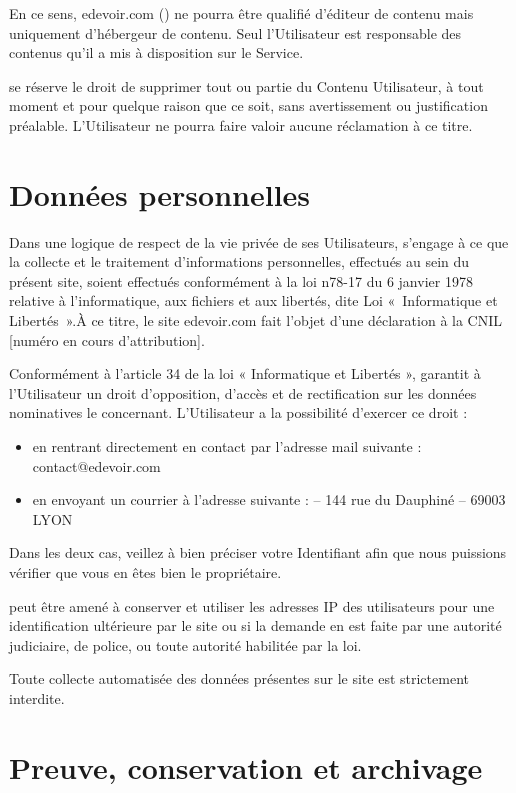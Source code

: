 En ce sens, edevoir.com (\eDevoir) ne pourra être qualifié d'éditeur de contenu mais uniquement d'hébergeur de contenu. Seul l'Utilisateur est responsable des contenus qu'il a mis à disposition sur le Service.

\eDevoir se réserve le droit de supprimer tout ou partie du Contenu Utilisateur, à tout moment et pour quelque raison que ce soit, sans avertissement ou justification préalable. L'Utilisateur ne pourra faire valoir aucune réclamation à ce titre. 


\section{Données personnelles}

Dans une logique de respect de la vie privée de ses Utilisateurs, \eDevoir s'engage à ce que la collecte et le traitement d'informations personnelles, effectués au sein du présent site, soient effectués conformément à la loi n78-17 du 6 janvier 1978 relative à l'informatique, aux fichiers et aux libertés, dite Loi «~Informatique et Libertés~».À ce titre, le site edevoir.com fait l'objet d'une déclaration à la CNIL [numéro en cours d'attribution].

Conformément à l'article 34 de la loi « Informatique et Libertés », \eDevoir garantit à l'Utilisateur un droit d'opposition, d'accès et de rectification sur les données nominatives le concernant. L'Utilisateur a la possibilité d'exercer ce droit :
\begin{itemize}
   \item en rentrant directement en contact par l'adresse mail suivante : contact@edevoir.com
   \item en envoyant un courrier à l'adresse suivante : \eDevoir -- 144 rue du Dauphiné -- 69003 LYON
\end{itemize}
 Dans les deux cas, veillez à bien préciser votre Identifiant afin que nous puissions vérifier que vous en êtes bien le propriétaire.

\eDevoir peut être amené à conserver et utiliser les adresses IP des utilisateurs pour une identification ultérieure par le site ou si la demande en est faite par  une autorité judiciaire, de police, ou toute autorité habilitée par la loi.

Toute collecte automatisée des données présentes sur le site est strictement interdite.


\section{Preuve, conservation et archivage}

